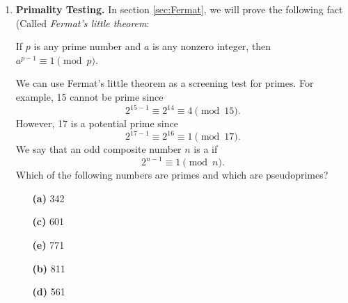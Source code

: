 {\begin{enumerate}
\begin{enumerate}
{}
 
\vspace{1ex}
 
The expression  $\lceil \sqrt{n}\, \rceil$ means the smallest integer
greater than or equal to the square root of $n$. Write another program
to do factorization using trial division and compare the speed of the
two algorithms. Which algorithm is faster and why?
 
 
 
 
\end{enumerate}
 
 
\bf\item\rm
{\bf Primality Testing.}
In section \ref{sec:Fermat}, we will prove the following fact (Called \emph{Fermat's little theorem}: 
\medskip

If  $p$ is any prime number and $a$ is any nonzero integer, then $a^{p-1} \equiv 1 \pmod{p}$.  
\medskip

We can use Fermat's little theorem as a screening test for primes. For example, 15 cannot be prime since
$$
2^{15-1} \equiv 2^{14} \equiv 4 \pmod{15}.
$$
However, 17 is a potential prime since
$$
2^{17-1} \equiv 2^{16} \equiv 1 \pmod{17}.
$$
We say that an odd composite number $n$ is a  if 
$$
2^{n-1} \equiv 1 \pmod{n}.
$$
Which of the following numbers are primes  and which are pseudoprimes?
 
 
\vspace{3pt}        %
 
\hspace{-7pt}
\begin{minipage}[t]{4.6in}
\noindent
\begin{minipage}[t]{2.25in}
\begin{itemize}
 
 \item[{\bf (a)}]
342
 
 \item[{\bf (c)}]
601
 
 \item[{\bf (e)}]
771
 
\end{itemize}
\end{minipage} \hfill
\begin{minipage}[t]{2.25in}
\begin{itemize}
 
 \item[{\bf (b)}]
811
 
 \item[{\bf (d)}]
561
 

\end{itemize}
\end{minipage}
\end{minipage}
\end{enumerate}}
